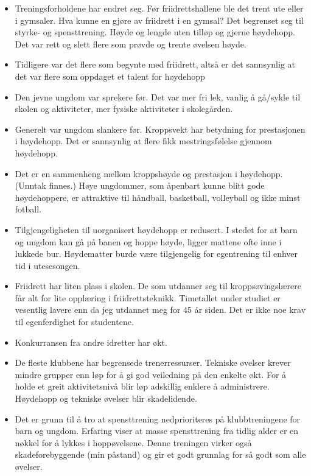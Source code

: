 \begin{itemize}
\item
  Treningsforholdene har endret seg. Før friidrettshallene ble det trent ute eller i gymsaler. Hva kunne en gjøre av friidrett i en gymsal? Det begrenset seg til styrke- og spensttrening. Høyde og lengde uten tilløp og gjerne høydehopp. Det var rett og slett flere som prøvde og trente øvelsen høyde.
\item
  Tidligere var det flere som begynte med friidrett, altså er det sannsynlig at det var flere som oppdaget et talent for høydehopp
\item
  Den jevne ungdom var sprekere før. Det var mer fri lek, vanlig å gå/sykle til skolen og aktiviteter, mer fysiske aktiviteter i skolegården.
\item
  Generelt var ungdom slankere før. Kroppsvekt har betydning for prestasjonen i høydehopp. Det er sannsynlig at flere fikk mestringsfølelse gjennom høydehopp.
\item
  Det er en sammenheng mellom kroppshøyde og prestasjon i høydehopp. (Unntak finnes.) Høye ungdommer, som åpenbart kunne blitt gode høydehoppere, er attraktive til håndball, basketball, volleyball og ikke minst fotball.
\item
  Tilgjengeligheten til uorganisert høydehopp er redusert. I stedet for at barn og ungdom kan gå på banen og hoppe høyde, ligger mattene ofte inne i lukkede bur. Høydematter burde være tilgjengelig for egentrening til enhver tid i utesesongen.
\item
  Friidrett har liten plass i skolen. De som utdanner seg til kroppsøvingslærere får alt for lite opplæring i friidrettsteknikk. Timetallet under studiet er vesentlig lavere enn da jeg utdannet meg for 45 år siden. Det er ikke noe krav til egenferdighet for studentene.
\item
  Konkurransen fra andre idretter har økt.
\item
  De fleste klubbene har begrensede trenerressurser. Tekniske øvelser krever mindre grupper enn løp for å gi god veiledning på den enkelte økt. For å holde et greit aktivitetsnivå blir løp adskillig enklere å administrere. Høydehopp og tekniske øvelser blir skadelidende.
\item
  Det er grunn til å tro at spensttrening nedprioriteres på klubbtreningene for barn og ungdom. Erfaring viser at masse spensttrening fra tidlig alder er en nøkkel for å lykkes i hoppøvelsene. Denne treningen virker også skadeforebyggende (min påstand) og gir et godt grunnlag for så godt som alle øvelser.

\end{itemize}
